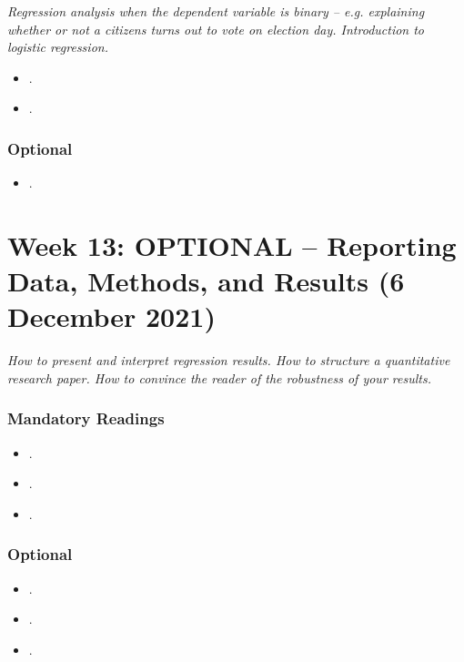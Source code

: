 \documentclass[abstract=on,parskip=full,headings=standardclasses,fontsize=11pt,paper=a4]{scrartcl}
\begin{document}
\textit{Regression analysis when the dependent variable is binary -- e.g. explaining whether or not a citizens turns out to vote on election day. Introduction to logistic regression.}


\begin{itemize}
\item {}.
\item {}.
\end{itemize}



\subsubsection*{Optional}
\begin{itemize}
\item {}.
\end{itemize}




\section{Week 13: OPTIONAL -- Reporting Data, Methods, and Results (6 December 2021)}


\textit{How to present and interpret regression results. How to structure a quantitative research paper. How to convince the reader of the robustness of your results.}


\subsubsection*{Mandatory Readings}
\begin{itemize}
\item {}.
\item {}.
\item {}.
\end{itemize}


\subsubsection*{Optional}
\begin{itemize}
\item {}.
\item {}.
\item {}.
\end{itemize}
\end{document}
